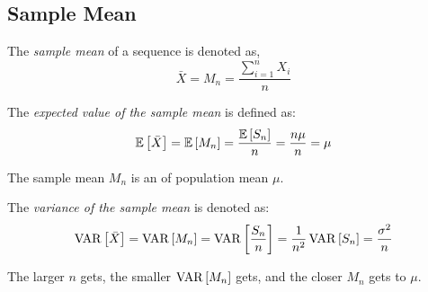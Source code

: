 \subsection{Sample Mean}\label{subsec:Sample Mean}
\begin{definition}\label{def:Sample Mean}
  The \emph{sample mean} of a sequence is denoted as,
  \begin{equation}\label{eq:Sample Mean}
    \bar{X} = M_{n} = \frac{\sum_{i=1}^{n} X_{i}}{n}
  \end{equation}
\end{definition}
\begin{definition}\label{def:Expected Value of Sample Mean}
  The \emph{expected value of the sample mean} is defined as:
  \begin{equation}\label{eq:Expected Value of Sample Mean}
    \operatorname{\operatorname{\mathbb{E}}} \left[ \bar{X} \right]
    = \operatorname{\operatorname{\mathbb{E}}} \left[ M_{n} \right]
    = \frac{\operatorname{\operatorname{\mathbb{E}}} \left[ S_{n} \right]}{n}
    = \frac{n \mu}{n}
    = \mu
  \end{equation}
  \begin{remark}
    The sample mean $M_{n}$ is an \emph{} of population mean $\mu$.
  \end{remark}
\end{definition}
\begin{definition}\label{def:Variance of Sample Mean}
  The \emph{variance of the sample mean} is denoted as:
  \begin{equation}\label{eq:Variance of Sample Mean}
    \operatorname{\operatorname{VAR}} \left[ \bar{X} \right]
    = \operatorname{\operatorname{VAR}} \left[ M_{n} \right]
    = \operatorname{\operatorname{VAR}} \left[ \frac{S_{n}}{n} \right]
    = \frac{1}{n^{2}} \operatorname{\operatorname{VAR}} \left[ S_{n} \right]
    = \frac{\sigma^{2}}{n}
  \end{equation}
  \begin{remark}
    The larger $n$ gets, the smaller $\operatorname{\operatorname{VAR}} \left[ M_{n} \right]$ gets, and the closer $M_{n}$ gets to $\mu$.
  \end{remark}
\end{definition}

